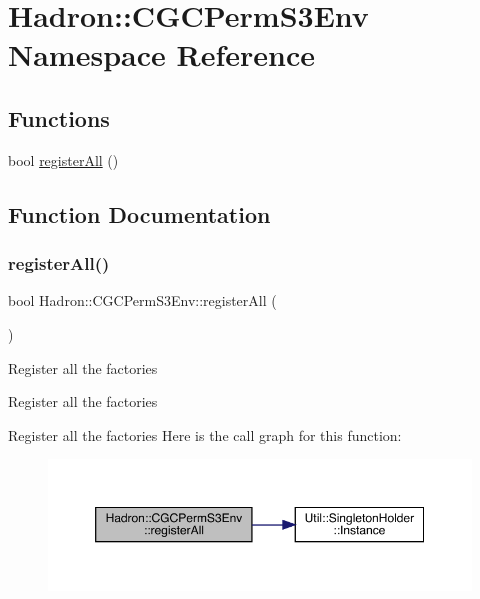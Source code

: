 \hypertarget{namespaceHadron_1_1CGCPermS3Env}{}\section{Hadron\+:\+:C\+G\+C\+Perm\+S3\+Env Namespace Reference}
\label{namespaceHadron_1_1CGCPermS3Env}
\subsection*{Functions}
\begin{DoxyCompactItemize}
\item 
bool \mbox{\hyperlink{namespaceHadron_1_1CGCPermS3Env_af27896ea7c15a1cdc0c664037d8f9a94}{register\+All}} ()
\end{DoxyCompactItemize}


\subsection{Function Documentation}
\mbox{\label{namespaceHadron_1_1CGCPermS3Env_af27896ea7c15a1cdc0c664037d8f9a94}} 
\subsubsection{\texorpdfstring{registerAll()}{registerAll()}}
{\footnotesize\ttfamily bool Hadron\+::\+C\+G\+C\+Perm\+S3\+Env\+::register\+All (\begin{DoxyParamCaption}{ }\end{DoxyParamCaption})}

Register all the factories

Register all the factories

Register all the factories Here is the call graph for this function\+:\nopagebreak
\begin{figure}[H]
\begin{center}
\leavevmode
\includegraphics[width=350pt]{dc/d06/namespaceHadron_1_1CGCPermS3Env_af27896ea7c15a1cdc0c664037d8f9a94_cgraph}
\end{center}
\end{figure}
